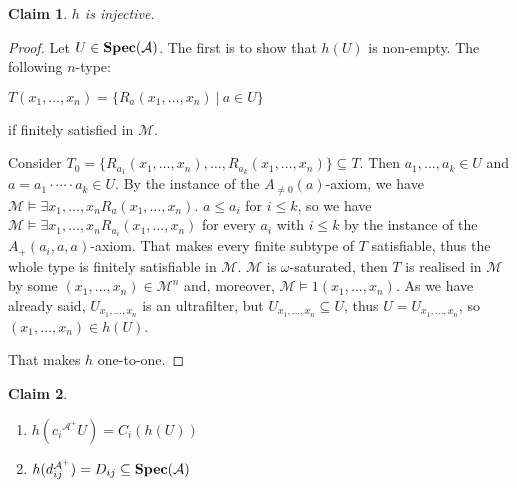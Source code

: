 \documentclass{article}
\theoremstyle{defin}
\theoremstyle{theorem}
\theoremstyle{claim}
\newtheorem{claim}{Claim}
\theoremstyle{prop}
\theoremstyle{lemma}
\theoremstyle{fact}
\theoremstyle{remark}
\theoremstyle{ex}
\theoremstyle{col}
\theoremstyle{question}
\begin{document}
\begin{claim}
$h$ is injective.
\end{claim}

\begin{proof}
Let $U \in {\bf Spec}(\mathcal{A})$. The first is to show that $h(U)$ is non-empty. The following $n$-type:
\begin{center}
$T(x_1, \dots, x_n) = \{ R_a(x_1, \dots, x_n) \: | \: a \in U \}$
\end{center}
if finitely satisfied in $\mathcal{M}$.

Consider $T_0 = \{ R_{a_1}(x_1, \dots, x_n), \ldots, R_{a_k}(x_1, \dots, x_n) \} \subseteq T$. 
Then $a_1, \dots, a_k \in U$ and $a = a_1 \cdot \cdots \cdot a_k \in U$. 
By the instance of the $A_{\neq 0}(a)$-axiom,
 we have $\mathcal{M} \models \exists x_1, \dots, x_n R_a(x_1, \dots, x_n)$.
$a \leq a_i$ for $i \leq k$, so we have $\mathcal{M} \models \exists x_1, \dots, x_n R_{a_i}(x_1, \dots, x_n)$ 
for every $a_i$ with $i \leq k$ by the instance of the $A_{+}(a_i, a, a)$-axiom. 
That makes every finite subtype of $T$ satisfiable, thus the whole type is finitely satisfiable in $\mathcal{M}$.
$\mathcal{M}$ is $\omega$-saturated, then $T$ is realised in $\mathcal{M}$ by some $(x_1, \dots, x_n) \in \mathcal{M}^n$ and,
moreover, $\mathcal{M} \models 1(x_1, \dots, x_n)$. As we have already said, $U_{x_1, \dots, x_n}$ is an ultrafilter, 
but $U_{x_1, \dots, x_n} \subseteq U$, thus $U = U_{x_1, \dots, x_n}$, so $(x_1, \dots, x_n) \in h(U)$.

That makes $h$ one-to-one.
\end{proof}

\begin{claim}
$ $

\begin{enumerate}
\item $h(c_i{^{\mathcal{A}^{+}}} U) = C_i (h(U))$
\item $h(d_{ij}^{\mathcal{A}^{+}}) = D_{ij} \subseteq {\bf Spec}(\mathcal{A})$
\end{enumerate}
\end{claim}
\end{document}
